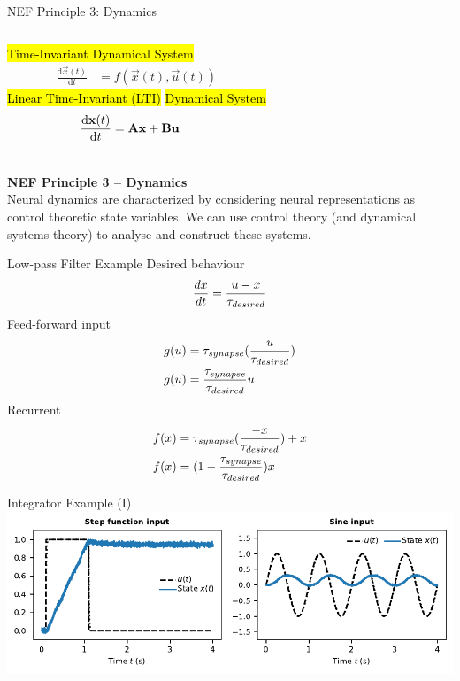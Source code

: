 \documentclass[handout,aspectratio=169]{beamer}
\begin{document}
	\begin{frame}{NEF Principle 3: Dynamics}
	\begin{columns}[b]
		\centering
		\hl{Time-Invariant Dynamical System}\\
		\begin{align*}
			\frac{\mathrm{d}\vec x(t)}{\mathrm{d}t} &= f(\vec x(t), \vec u(t))
		\end{align*}
		\centering
		\hl{Linear Time-Invariant (LTI)}
		\hl{Dynamical System}
		\begin{align*}
			\frac{\mathrm{d}{\mathbf{x}}(t)}{\mathrm{d}t} &= {\mathbf{A}} {\mathbf{x}} + {\mathbf{B}} {\mathbf{u}}
		\end{align*}
	\end{columns}
	\vspace{0.75cm}
	\begin{mdframed}
		\textbf{NEF Principle 3 -- Dynamics}\\
		Neural dynamics are characterized by considering neural representations as control theoretic state variables. We can use control theory (and dynamical systems theory) to analyse and construct these systems.
	\end{mdframed}
\end{frame}

\begin{frame}{Low-pass Filter Example}
Desired behaviour
\begin{align*}
	{dx \over dt} = {{u - x} \over \tau_{desired}}	
\end{align*}
Feed-forward input
\begin{align*}
	g(u) &= \tau_{synapse} ({u \over \tau_{desired}}) \\
	g(u) &= {\tau_{synapse} \over \tau_{desired}} u	
\end{align*}
Recurrent
\begin{align*}
	f(x) &= \tau_{synapse} ({{-x} \over \tau_{desired}}) + x \\
	f(x) &= (1-{\tau_{synapse} \over \tau_{desired}})x			
\end{align*}	
\end{frame}	

	\begin{frame}{Integrator Example (I)}
		\centering
		\includegraphics[width=\textwidth]{media/example_integrator.pdf}
	\end{frame}
\end{document}
